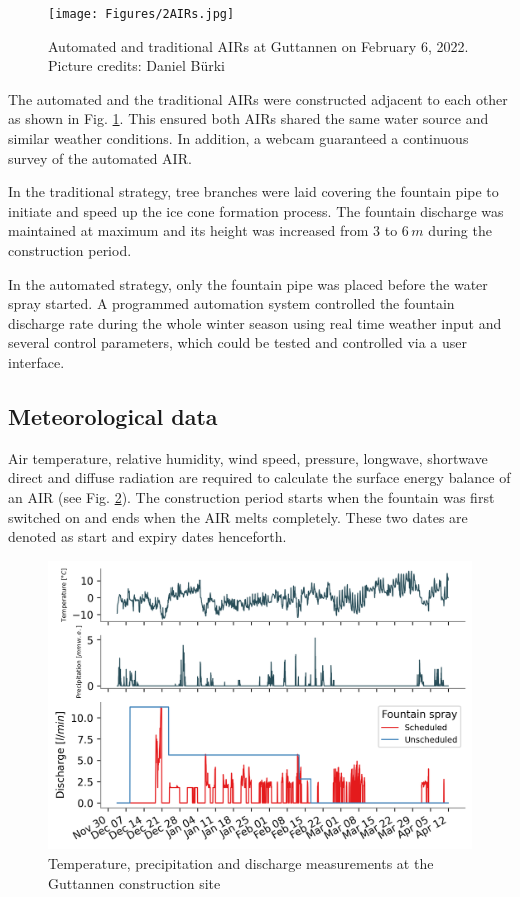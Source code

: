 \documentclass[tc, manuscript]{copernicus}
\begin{document}
\begin{figure}[t]
\texttt{[image: Figures/2AIRs.jpg]}
\caption{Automated and traditional AIRs  at Guttannen on February 6, 2022. Picture credits: Daniel Bürki}
\label{fig:2AIR} 
\end{figure}

The automated and the traditional AIRs were constructed adjacent to each other as shown in Fig. \ref{fig:2AIR}.
This ensured both AIRs shared the same water source and similar weather conditions. In addition, a webcam
guaranteed a continuous survey of the automated AIR.   

In the traditional strategy, tree branches were laid covering the fountain pipe to initiate and speed up the ice
cone formation process. The fountain discharge was maintained at maximum and its height was increased from 3 to
6\,$m$ during the construction period.

In the automated strategy, only the fountain pipe was placed before the water spray started. A programmed
automation system controlled the fountain discharge rate during the whole winter season using real time weather
input and several control parameters, which could be tested and controlled via a user interface. 

\subsection{Meteorological data}

Air temperature, relative humidity, wind speed, pressure, longwave, shortwave direct and diffuse radiation are
required to calculate the surface energy balance of an AIR (see Fig. \ref{fig:aws}). The construction period
starts when the fountain was first switched on and ends when the AIR melts completely. These two dates are denoted
as start and expiry dates henceforth.

\begin{figure}[t]
\includegraphics[width=12cm]{Figures/data.png}
\caption{Temperature, precipitation and discharge measurements at the Guttannen construction site}
\label{fig:aws} 
\end{figure}
\end{document}
